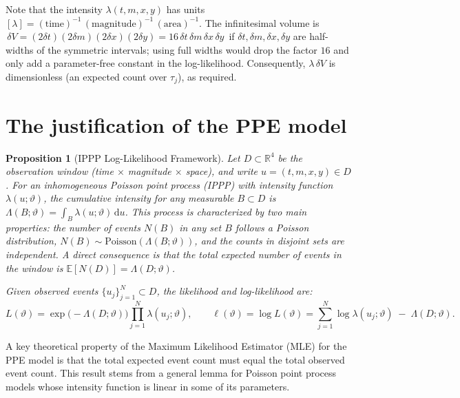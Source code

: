 \documentclass[extra,mreferee]{gji}
\theoremstyle{lemma}
\newtheorem{proposition}{Proposition}
\begin{document}
Note that the intensity $\lambda(t,m,x,y)$ has units$ [\lambda]=(\mathrm{time})^{-1}\,(\mathrm{magnitude})^{-1}\,(\mathrm{area})^{-1}$.
The infinitesimal volume is $\,\delta V=(2\delta t)(2\delta m)(2\delta x)(2\delta y)=16\,\delta t\,\delta m\,\delta x\,\delta y\,$ if $\delta t,\delta m,\delta x,\delta y$ are half-widths of the symmetric intervals; using full widths would drop the factor $16$ and only add a parameter-free constant in the log-likelihood. 
Consequently, $\lambda\,\delta V$ is dimensionless (an expected count over $\tau_j$), as required. 


\section{The justification of the PPE model} \label{sec:derive_ppe}

\begin{proposition}[IPPP Log-Likelihood Framework]
Let $D\subset\mathbb{R}^4$ be the observation window (time $\times$ magnitude $\times$ space), and write $u=(t,m,x,y)\in D$. For an inhomogeneous Poisson point process (IPPP) with intensity function $\lambda(u;\vartheta)$, the cumulative intensity for any measurable $B\subset D$ is $\Lambda(B;\vartheta)=\int_{B}\lambda(u;\vartheta)\,\mathrm{d}u$.
This process is characterized by two main properties: the number of events $N(B)$ in any set $B$ follows a Poisson distribution, $N(B)\sim \mathrm{Poisson}(\Lambda(B;\vartheta))$, and the counts in disjoint sets are independent. A direct consequence is that the total expected number of events in the window is $\mathbb{E}[N(D)]=\Lambda(D;\vartheta)$.

Given observed events $\{u_j\}_{j=1}^N\subset D$, the likelihood and log-likelihood are:
\[
L(\vartheta)
= \exp\!\big(-\Lambda(D;\vartheta)\big)\prod_{j=1}^N \lambda(u_j;\vartheta),
\qquad
\ell(\vartheta)=\log L(\vartheta)
= \sum_{j=1}^N \log \lambda(u_j;\vartheta)\;-\;\Lambda(D;\vartheta).
\]
\end{proposition}

A key theoretical property of the Maximum Likelihood Estimator (MLE) for the PPE model is that the total expected event count must equal the total observed event count. This result stems from a general lemma for Poisson point process models whose intensity function is linear in some of its parameters.
\end{document}
